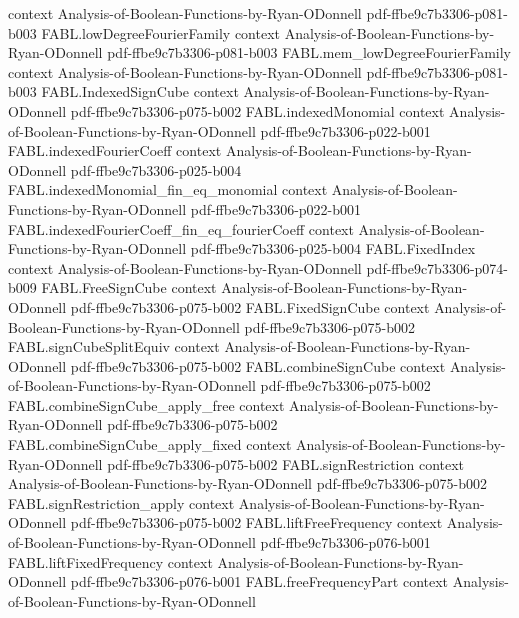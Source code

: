 \begin{theorem}
  {context}
  {Analysis-of-Boolean-Functions-by-Ryan-ODonnell}
  {pdf-ffbe9c7b3306-p081-b003}
\proofstep
  {FABL.lowDegreeFourierFamily}
  {context}
  {Analysis-of-Boolean-Functions-by-Ryan-ODonnell}
  {pdf-ffbe9c7b3306-p081-b003}
\proofstep
  {FABL.mem_lowDegreeFourierFamily}
  {context}
  {Analysis-of-Boolean-Functions-by-Ryan-ODonnell}
  {pdf-ffbe9c7b3306-p081-b003}
\proofstep
  {FABL.IndexedSignCube}
  {context}
  {Analysis-of-Boolean-Functions-by-Ryan-ODonnell}
  {pdf-ffbe9c7b3306-p075-b002}
\proofstep
  {FABL.indexedMonomial}
  {context}
  {Analysis-of-Boolean-Functions-by-Ryan-ODonnell}
  {pdf-ffbe9c7b3306-p022-b001}
\proofstep
  {FABL.indexedFourierCoeff}
  {context}
  {Analysis-of-Boolean-Functions-by-Ryan-ODonnell}
  {pdf-ffbe9c7b3306-p025-b004}
\proofstep
  {FABL.indexedMonomial_fin_eq_monomial}
  {context}
  {Analysis-of-Boolean-Functions-by-Ryan-ODonnell}
  {pdf-ffbe9c7b3306-p022-b001}
\proofstep
  {FABL.indexedFourierCoeff_fin_eq_fourierCoeff}
  {context}
  {Analysis-of-Boolean-Functions-by-Ryan-ODonnell}
  {pdf-ffbe9c7b3306-p025-b004}
\proofstep
  {FABL.FixedIndex}
  {context}
  {Analysis-of-Boolean-Functions-by-Ryan-ODonnell}
  {pdf-ffbe9c7b3306-p074-b009}
\proofstep
  {FABL.FreeSignCube}
  {context}
  {Analysis-of-Boolean-Functions-by-Ryan-ODonnell}
  {pdf-ffbe9c7b3306-p075-b002}
\proofstep
  {FABL.FixedSignCube}
  {context}
  {Analysis-of-Boolean-Functions-by-Ryan-ODonnell}
  {pdf-ffbe9c7b3306-p075-b002}
\proofstep
  {FABL.signCubeSplitEquiv}
  {context}
  {Analysis-of-Boolean-Functions-by-Ryan-ODonnell}
  {pdf-ffbe9c7b3306-p075-b002}
\proofstep
  {FABL.combineSignCube}
  {context}
  {Analysis-of-Boolean-Functions-by-Ryan-ODonnell}
  {pdf-ffbe9c7b3306-p075-b002}
\proofstep
  {FABL.combineSignCube_apply_free}
  {context}
  {Analysis-of-Boolean-Functions-by-Ryan-ODonnell}
  {pdf-ffbe9c7b3306-p075-b002}
\proofstep
  {FABL.combineSignCube_apply_fixed}
  {context}
  {Analysis-of-Boolean-Functions-by-Ryan-ODonnell}
  {pdf-ffbe9c7b3306-p075-b002}
\proofstep
  {FABL.signRestriction}
  {context}
  {Analysis-of-Boolean-Functions-by-Ryan-ODonnell}
  {pdf-ffbe9c7b3306-p075-b002}
\proofstep
  {FABL.signRestriction_apply}
  {context}
  {Analysis-of-Boolean-Functions-by-Ryan-ODonnell}
  {pdf-ffbe9c7b3306-p075-b002}
\proofstep
  {FABL.liftFreeFrequency}
  {context}
  {Analysis-of-Boolean-Functions-by-Ryan-ODonnell}
  {pdf-ffbe9c7b3306-p076-b001}
\proofstep
  {FABL.liftFixedFrequency}
  {context}
  {Analysis-of-Boolean-Functions-by-Ryan-ODonnell}
  {pdf-ffbe9c7b3306-p076-b001}
\proofstep
  {FABL.freeFrequencyPart}
  {context}
  {Analysis-of-Boolean-Functions-by-Ryan-ODonnell}

\end{theorem}
